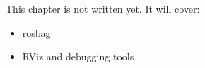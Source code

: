 \label{ch:ros4}
\begin{keyidea}
This chapter is not written yet. It will cover:
\begin{itemize}[nosep]
  \item rosbag
  \item RViz and debugging tools
\end{itemize}
\end{keyidea}
